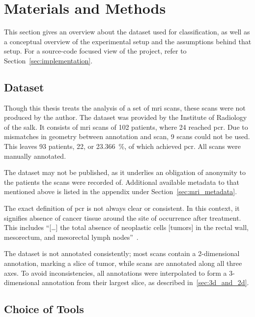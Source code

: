 \newpage{}
\section{Materials and Methods}

This section gives an overview about the dataset used for classification, as 
well as a conceptual overview of the experimental setup and the assumptions 
behind that setup. For a source-code 
focused view of the project, refer to Section~\ref{sec:implementation}.

\subsection{Dataset}\label{sec:materials_dataset}

Though this thesis treats the analysis of a set of \ac{mri} scans, these scans
were not produced by the author. The dataset was provided %
by the Institute of Radiology %
of the \ac{salk}. It consists of \ac{mri} scans of 102 patients, where 24 reached 
\ac{pcr}. Due to mismatches in geometry between annotation and scan, 9 scans
could not be used. This leaves 93 patients, 22, or \SI{23.366}{\percent}, of which achieved 
\ac{pcr}. All scans were manually annotated.

The dataset may not be published, as it underlies an obligation of anonymity to 
the patients the scans were recorded of. Additional available metadata to that 
mentioned above is listed in the appendix under Section~\ref{sec:mri_metadata}.

The exact definition of \ac{pcr} is not always clear or consistent.
In this context, it signifies absence of cancer tissue
around the site of occurrence after treatment. This includes \enquote{[\dots] 
the total absence of neoplastic cells [tumors] in the rectal wall, mesorectum, 
and mesorectal lymph nodes}~\cite[p.~2823]{Zorcolo2012}\cite{clinical_and_oncological_results_of_pcr}.

The dataset is not annotated consistently; most scans contain a 2-dimensional 
annotation, marking a slice of tumor, while \threeDcount{} scans are annotated along all 
three axes. To avoid inconsistencies, all annotations were interpolated to form
a 3-dimensional annotation from their largest slice, as described 
in~\ref{sec:3d_and_2d}.

\subsection{Choice of Tools}

